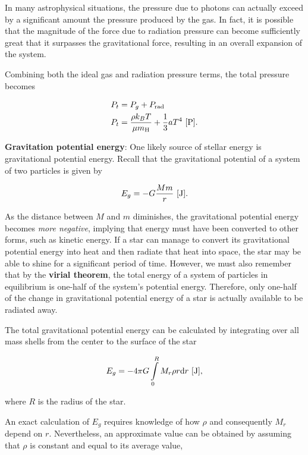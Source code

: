 \documentclass[a4paper,10pt]{article}
\begin{document}
{\noindent}In many astrophysical situations, the pressure due to photons can actually exceed by a significant amount the pressure produced by the gas. In fact, it is possible that the magnitude of the force due to radiation pressure can become sufficiently great that it surpasses the gravitational force, resulting in an overall expansion of the system.

{\noindent}Combining both the ideal gas and radiation pressure terms, the total pressure becomes

\begin{align*}
    P_t &= P_g + P_{\rm rad} \\
    P_t &= \frac{\rho k_BT}{\mu m_{\rm H}} + \frac{1}{3}aT^4 ~ [{\rm P}].
\end{align*}

{\noindent}\textbf{Gravitation potential energy}: One likely source of stellar energy is gravitational potential energy. Recall that the gravitational potential of a system of two particles is given by

\begin{align*}
    E_g = -G\frac{Mm}{r} ~ [{\rm J}].
\end{align*}

{\noindent}As the distance between $M$ and $m$ diminishes, the gravitational potential energy becomes \textit{more negative}, implying that energy must have been converted to other forms, such as kinetic energy. If a star can manage to convert its gravitational potential energy into heat and then radiate that heat into space, the star may be able to shine for a significant period of time. However, we must also remember that by the \textbf{virial theorem}, the total energy of a system of particles in equilibrium is one-half of the system's potential energy. Therefore, only one-half of the change in gravitational potential energy of a star is actually available to be radiated away.

{\noindent}The total gravitational potential energy can be calculated by integrating over all mass shells from the center to the surface of the star

\begin{align*}
    E_g = -4\pi G\int\limits_0^R M_r\rho r{\rm d}r ~ [{\rm J}],
\end{align*}

{\noindent}where $R$ is the radius of the star.

{\noindent}An exact calculation of $E_g$ requires knowledge of how $\rho$ and consequently $M_r$ depend on $r$. Nevertheless, an approximate value can be obtained by assuming that $\rho$ is constant and equal to its average value,
\end{document}
